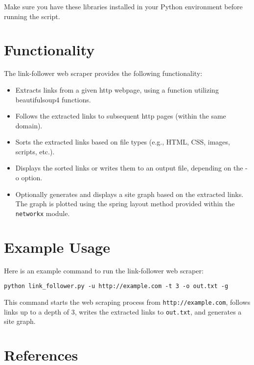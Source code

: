 \documentclass{article}
\begin{document}
Make sure you have these libraries installed in your Python environment before running the script.

\section{Functionality}
The link-follower web scraper provides the following functionality:

\begin{itemize}
  \item Extracts links from a given http webpage, using a function utilizing beautifulsoup4 \cite{richardson2007} functions.
  \item Follows the extracted links to subsequent http pages (within the same domain).
  \item Sorts the extracted links based on file types (e.g., HTML, CSS, images, scripts, etc.).
  \item Displays the sorted links or writes them to an output file, depending on the -o option.
  \item Optionally generates and displays a site graph based on the extracted links. The graph is plotted using the spring layout method provided within the \texttt{networkx} \cite{networkx} module.
\end{itemize}

\section{Example Usage}
Here is an example command to run the link-follower web scraper:

\begin{verbatim}
python link_follower.py -u http://example.com -t 3 -o out.txt -g
\end{verbatim}

This command starts the web scraping process from \texttt{http://example.com}, follows links up to a depth of 3, writes the extracted links to \texttt{out.txt}, and generates a site graph.

\section{References}
\end{document}
